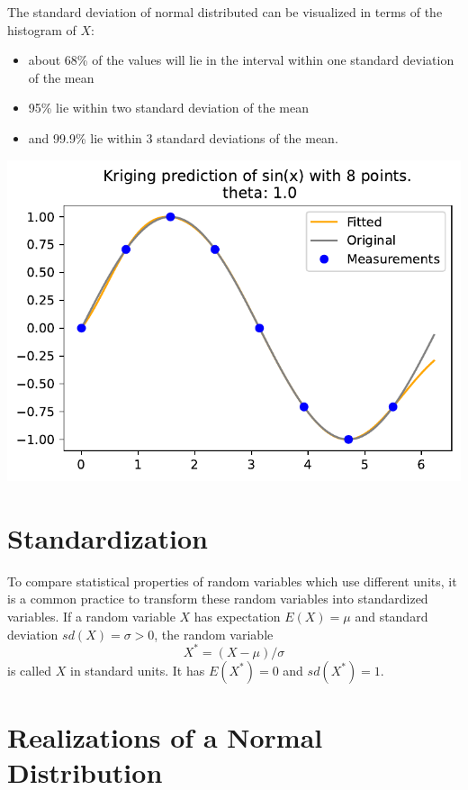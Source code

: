 \documentclass[
  letterpaper,
  DIV=11,
  numbers=noendperiod]{scrreprt}
\providecommand{\tightlist}{%
  \setlength{\itemsep}{0pt}\setlength{\parskip}{0pt}}\usepackage{longtable,booktabs,array}
\begin{document}
The standard deviation of normal distributed can be visualized in terms
of the histogram of \(X\):

\begin{itemize}
\tightlist
\item
  about 68\% of the values will lie in the interval within one standard
  deviation of the mean
\item
  95\% lie within two standard deviation of the mean
\item
  and 99.9\% lie within 3 standard deviations of the mean.
\end{itemize}

\includegraphics{006_num_gp_files/figure-pdf/cell-21-output-1.pdf}

\hypertarget{standardization}{%
\section{Standardization}\label{standardization}}

To compare statistical properties of random variables which use
different units, it is a common practice to transform these random
variables into standardized variables. If a random variable \(X\) has
expectation \(E(X) = \mu\) and standard deviation \(sd(X) = \sigma >0\),
the random variable \[
X^{\ast} = (X-\mu)/\sigma
\] is called \(X\) in standard units. It has \(E(X^{\ast}) = 0\) and
\(sd(X^{\ast}) =1\).

\hypertarget{realizations-of-a-normal-distribution}{%
\section{Realizations of a Normal
Distribution}\label{realizations-of-a-normal-distribution}}
\end{document}

